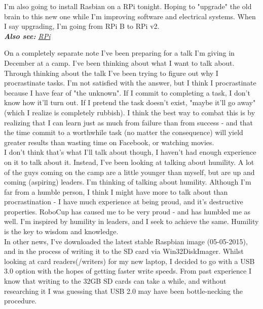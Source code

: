     		I'm also going to install Rasbian on a RPi tonight. Hoping to "upgrade" the old brain to this new one while I'm improving software and electrical systems. When I say upgrading, I'm going from RPi B to RPi v2.\\
            
            \textit{\textbf{Also see: }\hyperref[Rasberry Pi]{RPi}}
    		
    		On a completely separate note I've been preparing for a talk I'm giving in December at a camp. I've been thinking about what I want to talk about. Through thinking about the talk I've been trying to figure out why I procrastinate tasks. I'm not satisfied with the answer, but I think I procrastinate because I have fear of "the unknown". If I commit to completing a task, I don't know how it'll turn out. If I pretend the task doesn't exist, "maybe it'll go away" (which I realize is completely rubbish). I think the best way to combat this is by realizing that I can learn just as much from failure than from success - and that the time commit to a worthwhile task (no matter the consequence) will yield greater results than wasting time on Facebook, or watching movies.\\
    		
    		I don't think that's what I'll talk about though, I haven't had enough experience on it to talk about it. Instead, I've been looking at talking about humility. A lot of the guys coming on the camp are a little younger than myself, but are up and coming (aspiring) leaders. I'm thinking of talking about humility. Although I'm far from a humble person, I think I might have more to talk about than procrastination - I have much experience at being proud, and it's destructive properties. RoboCup has caused me to be very proud - and has humbled me as well. I'm inspired by humility in leaders, and I seek to achieve the same. Humility is the key to wisdom and knowledge.\\
    		
    		In other news, I've downloaded the latest stable Raspbian image (05-05-2015), and in the process of writing it to the SD card via Win32DiskImager. Whilst looking at card readers(/writers) for my new laptop, I decided to go with a USB 3.0 option with the hopes of getting faster write speeds. From past experience I know that writing to the 32GB SD cards can take a while, and without researching it I was guessing that USB 2.0 may have been bottle-necking the procedure.\\
    		
